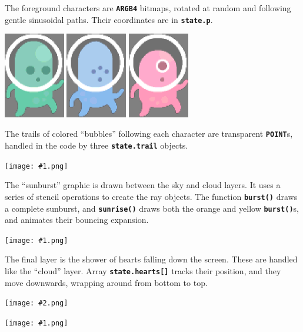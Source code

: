 \documentclass[10pt]{book}
\newcommand{\png}[1]{
\begin{center}
\texttt{[image: \#1.png]}
\end{center}
}
\newcommand{\szpng}[2]{
\begin{center}
\texttt{[image: \#2.png]}
\end{center}
}
\newcommand{\mach}[1]{\texttt{\textbf{#1}}}
\begin{document}
\newpage
The foreground characters are \mach{ARGB4} bitmaps, rotated at random
and following gentle sinusoidal paths.
Their coordinates are in \mach{state.p}.
\begin{center}
\includegraphics[width=0.2\textwidth]{previews/kenney-PLAYER1-00.png}
\includegraphics[width=0.2\textwidth]{previews/kenney-PLAYER1-01.png}
\includegraphics[width=0.2\textwidth]{previews/kenney-PLAYER1-02.png}
\end{center}
The trails of colored ``bubbles'' following each character are transparent
\mach{POINT}s, handled in the code by three \mach{state.trail} objects.
\png{kenney_3}

The ``sunburst'' graphic is drawn between the sky and cloud layers.
It uses a series of stencil operations to create the ray objects.
The function \mach{burst()} draws a complete sunburst, and
\mach{sunrise()} draws both the orange and yellow \mach{burst()}s, and animates their bouncing expansion.

\png{kenney_4}

The final layer is the shower of hearts falling down the screen.
These are handled like the ``cloud'' layer.
Array \mach{state.hearts[]} tracks their position, and they move downwards, wrapping around from bottom to top.
\szpng{0.2}{previews/kenney-HEART-00}

\png{kenney_5}
\end{document}
